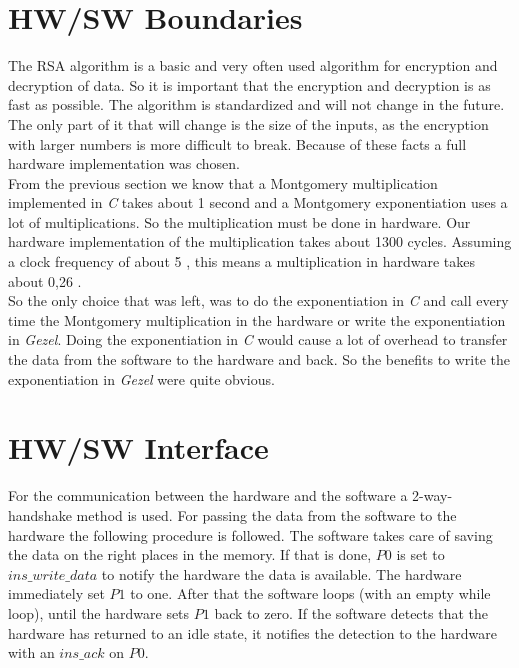 \documentclass[a4paper]{article}
\begin{document}
\section{HW/SW Boundaries}

The RSA algorithm is a basic and very often used algorithm for encryption and decryption of data. So it is important that the encryption and decryption is as fast as possible. The algorithm is standardized and will not change in the future. The only part of it that will change is the size of the inputs, as the encryption with larger numbers is more difficult to break. Because of these facts a full hardware implementation was chosen.\\

From the previous section we know that a Montgomery multiplication implemented in \textit{C} takes about 1 second and a Montgomery exponentiation uses a lot of multiplications. So the multiplication must be done in hardware. Our hardware implementation of the multiplication takes about 1300 cycles. Assuming a clock frequency of about 5 \mega \hertz, this means a multiplication in hardware takes about 0,26 \micro \second.\\

So the only choice that was left, was to do the exponentiation in \textit{C} and call every time the Montgomery multiplication in the hardware or write the exponentiation in \textit{Gezel}. Doing the exponentiation in \textit{C} would cause a lot of overhead to transfer the data from the software to the hardware and back. So the benefits to write the exponentiation in \textit{Gezel} were quite obvious.

\section{HW/SW Interface}

For the communication between the hardware and the software a 2-way-handshake method is used. For passing the data from the software to the hardware the following procedure is followed. The software takes care of saving the data on the right places in the memory. If that is done, $P0$ is set to $ins\_write\_data$ to notify the hardware the data is available. The hardware immediately set $P1$ to one. After that the software loops (with an empty while loop), until the hardware sets $P1$ back to zero. If the software detects that the hardware has returned to an idle state, it notifies the detection to the hardware with an $ins\_ack$ on $P0$.\\
\end{document}
